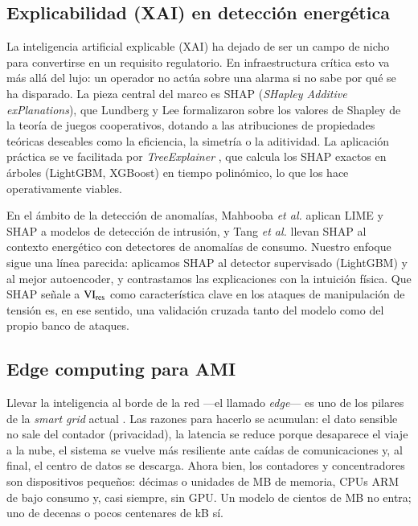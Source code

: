 \subsection{Explicabilidad (XAI) en detección energética}

La inteligencia artificial explicable (XAI) ha dejado de ser un campo de nicho para convertirse en un requisito regulatorio. En infraestructura crítica esto va más allá del lujo: un operador no actúa sobre una alarma si no sabe por qué se ha disparado. La pieza central del marco es SHAP (\textit{SHapley Additive exPlanations}), que Lundberg y Lee \cite{lundberg2017shap} formalizaron sobre los valores de Shapley de la teoría de juegos cooperativos, dotando a las atribuciones de propiedades teóricas deseables como la eficiencia, la simetría o la aditividad. La aplicación práctica se ve facilitada por \textit{TreeExplainer} \cite{lundberg2020fromlocal}, que calcula los SHAP exactos en árboles (LightGBM, XGBoost) en tiempo polinómico, lo que los hace operativamente viables.

En el ámbito de la detección de anomalías, Mahbooba \emph{et al.} \cite{mahbooba2021xai} aplican LIME y SHAP a modelos de detección de intrusión, y Tang \emph{et al.} \cite{tang2024xaienergy} llevan SHAP al contexto energético con detectores de anomalías de consumo. Nuestro enfoque sigue una línea parecida: aplicamos SHAP al detector supervisado (LightGBM) y al mejor autoencoder, y contrastamos las explicaciones con la intuición física. Que SHAP señale a $\mathrm{VI}_{\text{res}}$ como característica clave en los ataques de manipulación de tensión es, en ese sentido, una validación cruzada tanto del modelo como del propio banco de ataques.

\subsection{Edge computing para AMI}

Llevar la inteligencia al borde de la red ---el llamado \textit{edge}--- es uno de los pilares de la \textit{smart grid} actual \cite{shi2016edge,oliveira2021edge}. Las razones para hacerlo se acumulan: el dato sensible no sale del contador (privacidad), la latencia se reduce porque desaparece el viaje a la nube, el sistema se vuelve más resiliente ante caídas de comunicaciones y, al final, el centro de datos se descarga. Ahora bien, los contadores y concentradores son dispositivos pequeños: décimas o unidades de MB de memoria, CPUs ARM de bajo consumo y, casi siempre, sin GPU. Un modelo de cientos de MB no entra; uno de decenas o pocos centenares de kB sí.

